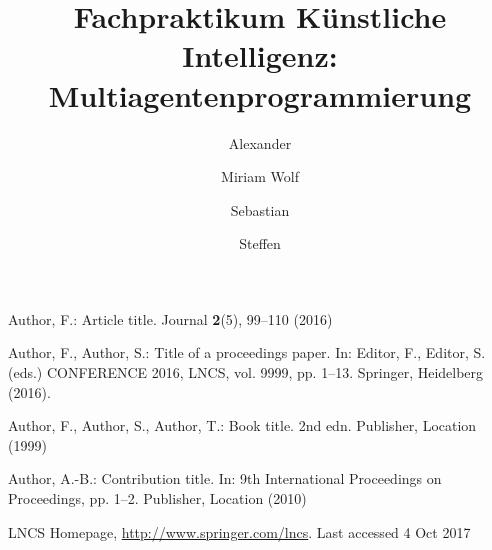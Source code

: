 \documentclass[runningheads]{llncs}
\begin{document}
%
\title{Fachpraktikum Künstliche Intelligenz: Multiagentenprogrammierung}
%
%
\author{Alexander \and
Miriam Wolf \and
Sebastian \and
Steffen}
%
%
%
\maketitle              %
%
%
%
%
%










%
%
%
% 
% 
%
\begin{thebibliography}{8}
Author, F.: Article title. Journal \textbf{2}(5), 99--110 (2016)

Author, F., Author, S.: Title of a proceedings paper. In: Editor,
F., Editor, S. (eds.) CONFERENCE 2016, LNCS, vol. 9999, pp. 1--13.
Springer, Heidelberg (2016). 

Author, F., Author, S., Author, T.: Book title. 2nd edn. Publisher,
Location (1999)

Author, A.-B.: Contribution title. In: 9th International Proceedings
on Proceedings, pp. 1--2. Publisher, Location (2010)

LNCS Homepage, \url{http://www.springer.com/lncs}. Last accessed 4
Oct 2017
\end{thebibliography}
\end{document}
